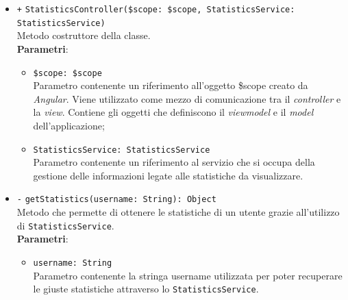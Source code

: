 \begin{itemize}
		\begin{itemize}
		\item \texttt{+} \texttt{StatisticsController(\$scope: \$scope, StatisticsService: StatisticsService)} \\ 
		Metodo costruttore della classe. \\
		\textbf{Parametri}:
		\begin{itemize}
			\item \texttt{\$scope: \$scope} \\
			Parametro contenente un riferimento all'oggetto \$scope creato da \textit{Angular}. Viene utilizzato come mezzo di comunicazione tra il \textit{controller} e la \textit{view}. Contiene gli oggetti che definiscono il \textit{viewmodel} e il \textit{model} dell'applicazione;
			\item \texttt{StatisticsService: StatisticsService} \\
			Parametro contenente un riferimento al servizio che si occupa della gestione delle informazioni legate alle statistiche da visualizzare.
		\end{itemize}
		\item \texttt{-} \texttt{getStatistics(username: String): Object} \\ 
		Metodo che permette di ottenere le statistiche di un utente grazie all'utilizzo di \texttt{StatisticsService}. \\
		\textbf{Parametri}: 
		\begin{itemize}
			\item \texttt{username: String} \\
			Parametro contenente la stringa username utilizzata per poter recuperare le giuste statistiche attraverso lo \texttt{StatisticsService}.
		\end{itemize}
	\end{itemize}
\end{itemize}

